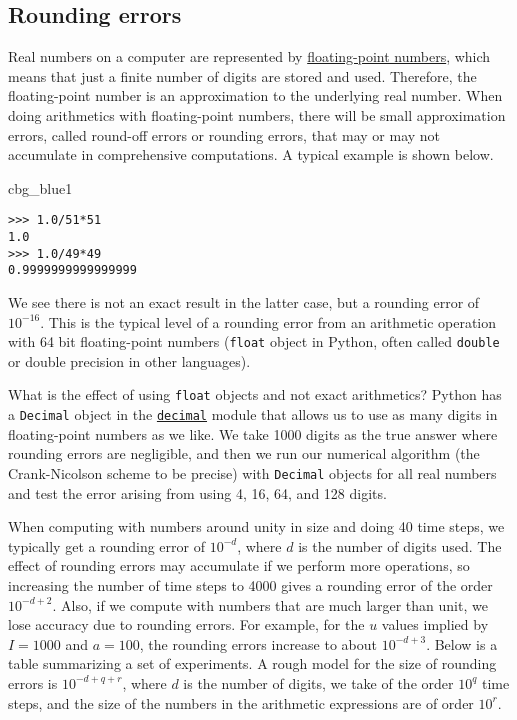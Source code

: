 \documentclass[graybox,sectrefs,envcountresetchap,open=right,final]{svmonodo}
\newenvironment{_cod_tight}[1]{
   \def\FrameCommand{\colorbox{#1}}
   \FrameRule0.6pt\MakeFramed {\FrameRestore}\vskip3mm}
   {\vskip0mm\endMakeFramed}
\newenvironment{cod}[1]{
\bgroup\rmfamily
\fboxsep=0mm\relax
\begin{_cod_tight}{#1}
\list{}{\parsep=-2mm\parskip=0mm\topsep=0pt\leftmargin=2mm
\rightmargin=2\leftmargin\leftmargin=4pt\relax}
\item\relax}
{\endlist\end{_cod_tight}\egroup}
\begin{document}
\subsection{Rounding errors}

Real numbers on a computer are represented by \href{{https://en.wikipedia.org/wiki/Floating_point}}{floating-point numbers}, which means that just a finite
number of digits are stored and used. Therefore, the floating-point number
is an approximation to the underlying real number. When doing
arithmetics with floating-point numbers, there will be small
approximation errors, called round-off errors or rounding errors,
that may or may not accumulate in comprehensive computations.
A typical example is shown below.

\begin{cod}{cbg_blue1}\begin{Verbatim}[numbers=none,fontsize=\fontsize{9pt}{9pt},baselinestretch=0.95,xleftmargin=2mm]
>>> 1.0/51*51
1.0
>>> 1.0/49*49
0.9999999999999999
\end{Verbatim}
\end{cod}
\noindent
We see there is not an exact result in the latter case, but a rounding
error of $10^{-16}$. This is the typical level of a rounding error
from an arithmetic operation with 64 bit floating-point numbers
(\texttt{float} object in Python, often called \texttt{double} or double precision
in other languages).

What is the effect of using \texttt{float} objects and not exact arithmetics?
Python has a \texttt{Decimal} object in the \href{{https://docs.python.org/2/library/decimal.html}}{\nolinkurl{decimal}} module that allows us
to use as many digits in floating-point numbers as we like. We take
1000 digits as the true answer where rounding errors are negligible,
and then we run our numerical algorithm (the Crank-Nicolson scheme to
be precise) with \texttt{Decimal} objects for all real numbers and test the
error arising from using 4, 16, 64, and 128 digits.

When computing with numbers around unity in size and doing 40 time
steps, we typically
get a rounding error of $10^{-d}$, where $d$ is the number
of digits used. The effect of rounding errors may accumulate if
we perform more operations, so increasing the number of time steps
to 4000 gives a rounding error of the order $10^{-d+2}$.
Also, if we compute with numbers that
are much larger than unit, we lose accuracy due to rounding
errors. For example, for the $u$ values implied by $I=1000$ and $a=100$,
the rounding errors increase to about $10^{-d+3}$. Below is
a table summarizing a set of experiments. A rough model for
the size of rounding errors is $10^{-d+q+r}$, where $d$ is the
number of digits, we take of the order $10^q$ time steps, and
the size of the numbers in the arithmetic expressions are of
order $10^r$.
\end{document}
